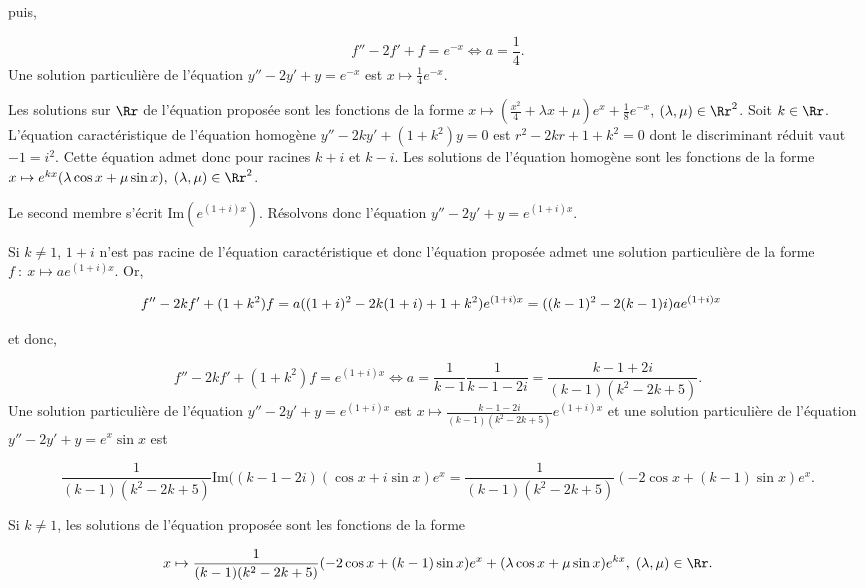 {{puis,

$$f''-2f'+f=e^{-x}\Leftrightarrow a=\frac{1}{4}.$$
Une solution particulière de l'équation $y''-2y'+y=e^{-x}$ est $x\mapsto\frac{1}{4}e^{-x}$.

Les solutions sur $\Rr$ de l'équation proposée sont les fonctions de la forme
$x\mapsto(\frac{x^2}{4}+\lambda x+\mu)e^x+\frac{1}{8}e^{-x}$, $(\lambda,\mu)\in\Rr^2$.
Soit $k\in\Rr$. L'équation caractéristique de l'équation homogène $y''-2ky'+(1+k^2)y=0$ est $r^2-2kr+1+k^2=0$
dont le discriminant réduit vaut $-1=i^2$. Cette équation admet donc pour racines $k+i$ et $k-i$. Les solutions de
l'équation homogène sont les fonctions de la forme $x\mapsto e^{kx}(\lambda\cos x+\mu\sin x),\;(\lambda,\mu)\in\Rr^2$.

Le second membre s'écrit $\mbox{Im}(e^{(1+i)x})$. Résolvons donc l'équation $y''-2y'+y=e^{(1+i)x}$.

Si $k\neq1$, $1+i$ n'est pas racine de l'équation caractéristique et donc
l'équation proposée admet une solution particulière de la forme $f~:~x\mapsto ae^{(1+i)x}$. Or,

\begin{align*}\ensuremath
f''-2kf'+(1+k^2)f&=a((1+i)^2-2k(1+i)+1+k^2)e^{(1+i)x}=((k-1)^2-2(k-1)i)ae^{(1+i)x}
\end{align*}

et donc,

$$f''-2kf'+(1+k^2)f=e^{(1+i)x}\Leftrightarrow a=\frac{1}{k-1}\frac{1}{k-1-2i}=\frac{k-1+2i}{(k-1)(k^2-2k+5)}.$$
Une solution particulière de l'équation $y''-2y'+y=e^{(1+i)x}$ est $x\mapsto\frac{k-1-2i}{(k-1)(k^2-2k+5)}e^{(1+i)x}$
et une solution particulière de l'équation $y''-2y'+y=e^{x}\sin x$ est

$$\frac{1}{(k-1)(k^2-2k+5)}\mbox{Im}((k-1-2i)(\cos x+i\sin x)e^x=\frac{1}{(k-1)(k^2-2k+5)}(-2\cos x+(k-1)\sin x)e^x.$$

Si $k\neq1$, les solutions de l'équation proposée sont les fonctions de la forme

$$x\mapsto\frac{1}{(k-1)(k^2-2k+5)}(-2\cos x+(k-1)\sin x)e^x+(\lambda\cos x+\mu\sin x)e^{kx},\;(\lambda,\mu)\in\Rr.$$
}
}
